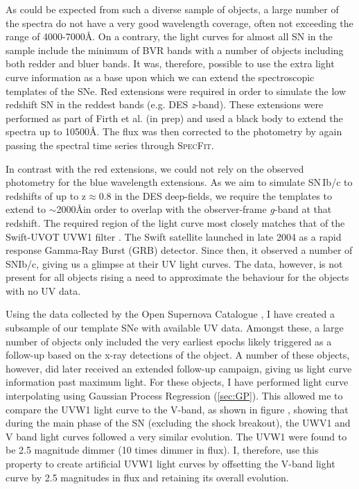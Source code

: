 As could be expected from such a diverse sample of objects, a large number of the spectra do not have a very good wavelength coverage, often not exceeding the range of 4000-7000\AA. On a contrary, the light curves for almost all SN in the sample include the minimum of BVR bands with a number of objects including both redder and bluer bands. It was, therefore, possible to use the extra light curve information as a base upon which we can extend the spectroscopic templates of the SNe. Red extensions were required in order to simulate the low redshift SN in the reddest bands (e.g. DES \textit{z}-band). These extensions were performed as part of Firth et al. (in prep) and used a black body to extend the spectra up to 10500\AA. The flux was then corrected to the photometry by again passing the spectral time series through \textsc{SpecFit}.

In contrast with the red extensions, we could not rely on the observed photometry for the blue wavelength extensions. As we aim to simulate SN\,Ib/c to redshifts of up to z$\approx$0.8 in the DES deep-fields, we require the templates to extend to $\sim$2000\AA in order to overlap with the observer-frame \textit{g}-band at that redshift. The required region of the light curve most closely matches that of the Swift-UVOT UVW1 filter \citep{Roming2005}. The Swift satellite launched in late 2004 as a rapid response Gamma-Ray Burst (GRB) detector. Since then, it observed a number of SNIb/c, giving us a glimpse at their UV light curves. The data, however, is not present for all objects rising a need to approximate the behaviour for the objects with no UV data.

Using the data collected by the Open Supernova Catalogue \citep[OSC;]{Guillochon2017}, I have created a subsample of our template SNe with available UV data. Amongst these, a large number of objects only included the very earliest epochs likely triggered as a follow-up based on the x-ray detections of the object. A number of these objects, however, did later received an extended follow-up campaign, giving us light curve information past maximum light. For these objects, I have performed light curve interpolating using Gaussian Process Regression (\cref{sec:GP}). This allowed me to compare the UVW1 light curve to the V-band, as shown in figure , showing that during the main phase of the SN (excluding the shock breakout), the UWV1 and V band light curves followed a very similar evolution. The UVW1 were found to be 2.5 magnitude dimmer (10 times dimmer in flux). I, therefore, use this property to create artificial UVW1 light curves by offsetting the V-band light curve by 2.5 magnitudes in flux and retaining its overall evolution.

